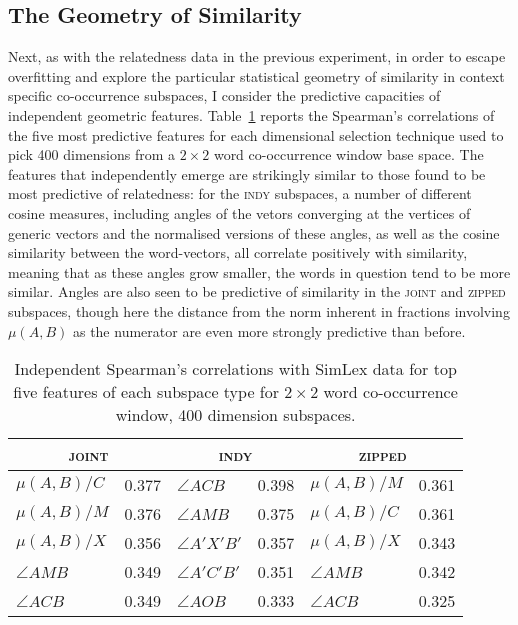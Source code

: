 \subsection{The Geometry of Similarity}
Next, as with the relatedness data in the previous experiment, in order to escape overfitting and explore the particular statistical geometry of similarity in context specific co-occurrence subspaces, I consider the predictive capacities of independent geometric features.  Table~\ref{tab:ind-similar} reports the Spearman's correlations of the five most predictive features for each dimensional selection technique used to pick 400 dimensions from a $2 \times 2$ word co-occurrence window base space.  The features that independently emerge are strikingly similar to those found to be most predictive of relatedness: for the \textsc{indy} subspaces, a number of different cosine measures, including angles of the vetors converging at the vertices of generic vectors and the normalised versions of these angles, as well as the cosine similarity between the word-vectors, all correlate positively with similarity, meaning that as these angles grow smaller, the words in question tend to be more similar.  Angles are also seen to be predictive of similarity in the \textsc{joint} and \textsc{zipped} subspaces, though here the distance from the norm inherent in fractions involving $\mu(A,B)$ as the numerator are even more strongly predictive than before.

\begin{table}
\centering
\begin{tabular}{lr|lr|lr}
\hline
\multicolumn{2}{c}{\textsc{joint}} & \multicolumn{2}{c}{\textsc{indy}} & \multicolumn{2}{c}{\textsc{zipped}} \\
\hline
$\mu (A,B)/C$ & 0.377 & $\angle ACB$ & 0.398 & $\mu (A,B)/M$ & 0.361 \\
$\mu (A,B)/M$ & 0.376 & $\angle AMB$ & 0.375 & $\mu (A,B)/C$ & 0.361 \\
$\mu (A,B)/X$ & 0.356 & $\angle A'X'B'$ & 0.357 & $\mu (A,B)/X$ & 0.343 \\
$\angle AMB$ & 0.349 & $\angle A'C'B'$ & 0.351 & $\angle AMB$ & 0.342 \\
$\angle ACB$ & 0.349 & $\angle AOB$ & 0.333 & $\angle ACB$ & 0.325 \\
\hline
\end{tabular}
\caption[Similarity Correlations of Individual Features]{Independent Spearman's correlations with SimLex data for top five features of each subspace type for $2 \times 2$ word co-occurrence window, 400 dimension subspaces.}
\label{tab:ind-similar}
\end{table}

